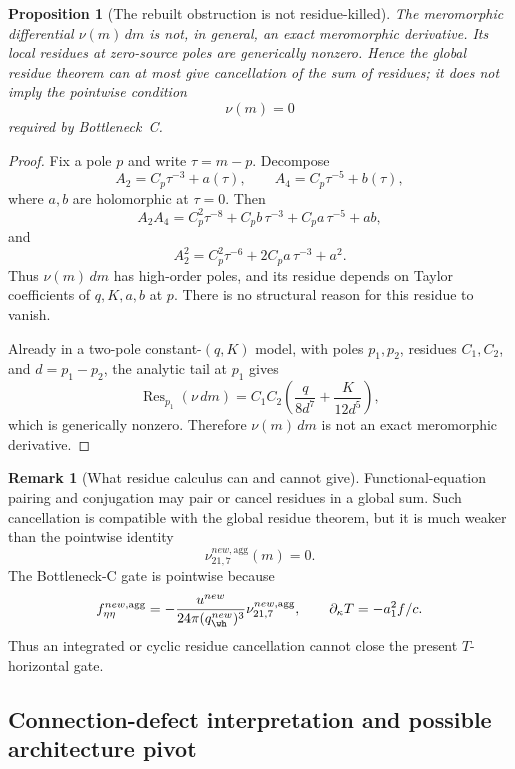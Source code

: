 \documentclass[11pt,a4paper]{amsart}
\def\new{new}%
\theoremstyle{plain}
\newtheorem{proposition}[theorem]{Proposition}
\theoremstyle{definition}
\newtheorem{remark}[theorem]{Remark}
\newcommand{\new}{\mathrm{new}}
\begin{document}
\begin{proposition}[The rebuilt obstruction is not residue-killed]
\label{prop:rebuilt-obstruction-not-residue-killed}
The meromorphic differential \(\nu(m)\,dm\) is not, in general, an exact
meromorphic derivative.  Its local residues at zero-source poles are
generically nonzero.  Hence the global residue theorem can at most give
cancellation of the sum of residues; it does not imply the pointwise condition
\[
\nu(m)=0
\]
required by Bottleneck~C.
\end{proposition}

\begin{proof}
Fix a pole \(p\) and write \(\tau=m-p\).  Decompose
\[
A_2=C_p\tau^{-3}+a(\tau),
\qquad
A_4=C_p\tau^{-5}+b(\tau),
\]
where \(a,b\) are holomorphic at \(\tau=0\).  Then
\[
A_2A_4
=
C_p^2\tau^{-8}
+
C_pb\,\tau^{-3}
+
C_pa\,\tau^{-5}
+
ab,
\]
and
\[
A_2^2
=
C_p^2\tau^{-6}
+
2C_pa\,\tau^{-3}
+
a^2.
\]
Thus \(\nu(m)\,dm\) has high-order poles, and its residue depends on Taylor
coefficients of \(q,K,a,b\) at \(p\).  There is no structural reason for this
residue to vanish.

Already in a two-pole constant-\((q,K)\) model, with poles \(p_1,p_2\),
residues \(C_1,C_2\), and \(d=p_1-p_2\), the analytic tail at \(p_1\) gives
\[
\operatorname{Res}_{p_1}(\nu\,dm)
=
C_1C_2
\left(
\frac{q}{8d^7}
+
\frac{K}{12d^5}
\right),
\]
which is generically nonzero.  Therefore \(\nu(m)\,dm\) is not an exact
meromorphic derivative.
\end{proof}

\begin{remark}[What residue calculus can and cannot give]
\label{rem:residue-calculus-limit-bc-obstruction}
Functional-equation pairing and conjugation may pair or cancel residues in a
global sum.  Such cancellation is compatible with the global residue theorem,
but it is much weaker than the pointwise identity
\[
\nu_{21,7}^{\new,\mathrm{agg}}(m)=0.
\]
The Bottleneck-C gate is pointwise because
\[
f_{\eta\eta}^{\new,\mathrm{agg}}
=
-\frac{u^{\new}}{24\pi(q_{\wh}^{\new})^3}
\nu_{21,7}^{\new,\mathrm{agg}},
\qquad
\partial_\kappa T=-a_1^2f/c.
\]
Thus an integrated or cyclic residue cancellation cannot close the present
\(T\)-horizontal gate.
\end{remark}

\subsection{Connection-defect interpretation and possible architecture pivot}
\label{subsec:connection-defect-interpretation-bc}
\end{document}

